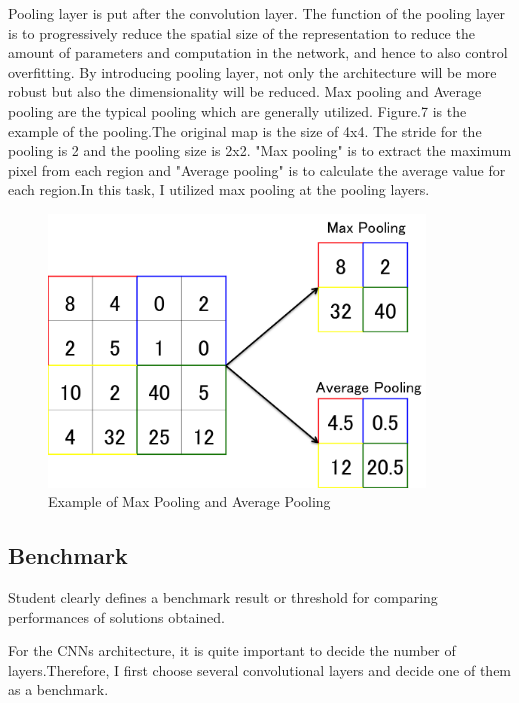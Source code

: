 \documentclass[a4paper,10pt,fleqn]{article}
\begin{document}
Pooling layer is put after the convolution layer. %
The function of the pooling layer is to progressively reduce the spatial size of the representation to reduce the amount of parameters and computation in the network, and hence to also control overfitting.
By introducing pooling layer, not only the architecture will be more robust but also the dimensionality will be reduced. Max pooling and Average pooling are the typical pooling which are generally utilized. Figure.7 is the example of the pooling.The original map is the size of 4x4. The stride for the pooling is 2 and the pooling size is 2x2. "Max pooling" is to extract the maximum pixel from each region and "Average pooling" is to calculate the average value for each region.In this task, I utilized max pooling at the pooling layers.

\begin{figure}[htbp]

	\begin{center}
	\includegraphics[width=10cm]{picture/Pooling.png}
	\caption{Example of Max Pooling and Average Pooling}
	\end{center}
	\label{fig:seven}

\end{figure}


\subsection{Benchmark}
Student clearly defines a benchmark result or threshold for comparing performances of solutions obtained.

For the CNNs architecture, it is quite important to decide the number of layers.Therefore, I first choose several convolutional layers and decide one of them as a benchmark.
\end{document}
